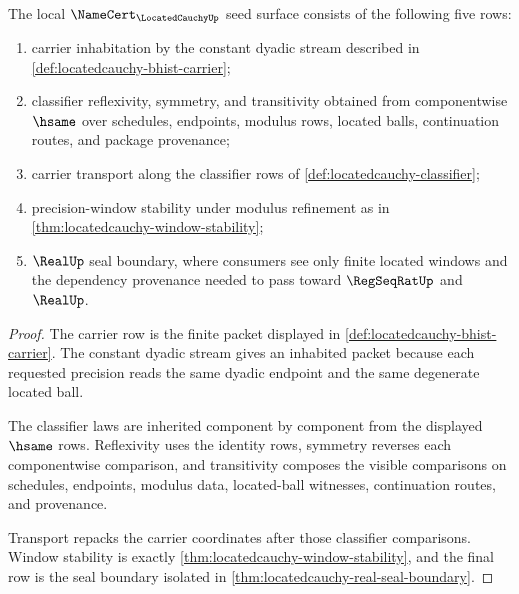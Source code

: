 \begin{theorem}
\label{thm:locatedcauchy-namecert-obligation-surface}
The local $\NameCert_{\LocatedCauchyUp}$ seed surface consists of the following
five rows:
\begin{enumerate}
\item carrier inhabitation by the constant dyadic stream described in
\autoref{def:locatedcauchy-bhist-carrier};
\item classifier reflexivity, symmetry, and transitivity obtained from
componentwise $\hsame$ over schedules, endpoints, modulus rows, located balls,
continuation routes, and package provenance;
\item carrier transport along the classifier rows of
\autoref{def:locatedcauchy-classifier};
\item precision-window stability under modulus refinement as in
\autoref{thm:locatedcauchy-window-stability};
\item $\RealUp$ seal boundary, where consumers see only finite located windows
and the dependency provenance needed to pass toward $\RegSeqRatUp$ and
$\RealUp$.
\end{enumerate}
\end{theorem}
\begin{proof}
The carrier row is the finite packet displayed in
\autoref{def:locatedcauchy-bhist-carrier}. The constant dyadic stream gives an
inhabited packet because each requested precision reads the same dyadic endpoint
and the same degenerate located ball.

The classifier laws are inherited component by component from the displayed
$\hsame$ rows. Reflexivity uses the identity rows, symmetry reverses each
componentwise comparison, and transitivity composes the visible comparisons on
schedules, endpoints, modulus data, located-ball witnesses, continuation
routes, and provenance.

Transport repacks the carrier coordinates after those classifier comparisons.
Window stability is exactly
\autoref{thm:locatedcauchy-window-stability}, and the final row is the seal
boundary isolated in
\autoref{thm:locatedcauchy-real-seal-boundary}.
\end{proof}

